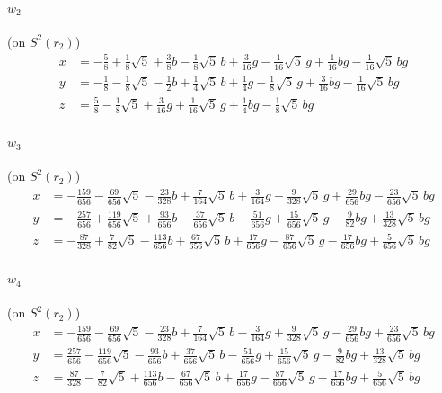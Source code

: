 \documentclass[11pt]{article}
\renewcommand{\_}{\textunderscore\allowbreak}
\theoremstyle{remark}
\begin{document}
{\paragraph{$w_{2}$} (on $S^2(r_2)$)
\begin{align*}
x&=-\tfrac{5}{8}+\tfrac{1}{8}\sqrt5+\tfrac{3}{8}b-\tfrac{1}{8}\sqrt5\,b+\tfrac{3}{16}g-\tfrac{1}{16}\sqrt5\,g+\tfrac{1}{16}bg-\tfrac{1}{16}\sqrt5\,bg\\
y&=-\tfrac{1}{8}-\tfrac{1}{8}\sqrt5-\tfrac{1}{2}b+\tfrac{1}{4}\sqrt5\,b+\tfrac{1}{4}g-\tfrac{1}{8}\sqrt5\,g+\tfrac{3}{16}bg-\tfrac{1}{16}\sqrt5\,bg\\
z&=\tfrac{5}{8}-\tfrac{1}{8}\sqrt5+\tfrac{3}{16}g+\tfrac{1}{16}\sqrt5\,g+\tfrac{1}{4}bg-\tfrac{1}{8}\sqrt5\,bg
\end{align*}

\paragraph{$w_{3}$} (on $S^2(r_2)$)
\begin{align*}
x&=-\tfrac{159}{656}-\tfrac{69}{656}\sqrt5-\tfrac{23}{328}b+\tfrac{7}{164}\sqrt5\,b+\tfrac{3}{164}g-\tfrac{9}{328}\sqrt5\,g+\tfrac{29}{656}bg-\tfrac{23}{656}\sqrt5\,bg\\
y&=-\tfrac{257}{656}+\tfrac{119}{656}\sqrt5+\tfrac{93}{656}b-\tfrac{37}{656}\sqrt5\,b-\tfrac{51}{656}g+\tfrac{15}{656}\sqrt5\,g-\tfrac{9}{82}bg+\tfrac{13}{328}\sqrt5\,bg\\
z&=-\tfrac{87}{328}+\tfrac{7}{82}\sqrt5-\tfrac{113}{656}b+\tfrac{67}{656}\sqrt5\,b+\tfrac{17}{656}g-\tfrac{87}{656}\sqrt5\,g-\tfrac{17}{656}bg+\tfrac{5}{656}\sqrt5\,bg
\end{align*}

\paragraph{$w_{4}$} (on $S^2(r_2)$)
\begin{align*}
x&=-\tfrac{159}{656}-\tfrac{69}{656}\sqrt5-\tfrac{23}{328}b+\tfrac{7}{164}\sqrt5\,b-\tfrac{3}{164}g+\tfrac{9}{328}\sqrt5\,g-\tfrac{29}{656}bg+\tfrac{23}{656}\sqrt5\,bg\\
y&=\tfrac{257}{656}-\tfrac{119}{656}\sqrt5-\tfrac{93}{656}b+\tfrac{37}{656}\sqrt5\,b-\tfrac{51}{656}g+\tfrac{15}{656}\sqrt5\,g-\tfrac{9}{82}bg+\tfrac{13}{328}\sqrt5\,bg\\
z&=\tfrac{87}{328}-\tfrac{7}{82}\sqrt5+\tfrac{113}{656}b-\tfrac{67}{656}\sqrt5\,b+\tfrac{17}{656}g-\tfrac{87}{656}\sqrt5\,g-\tfrac{17}{656}bg+\tfrac{5}{656}\sqrt5\,bg
\end{align*}

}
\end{document}
